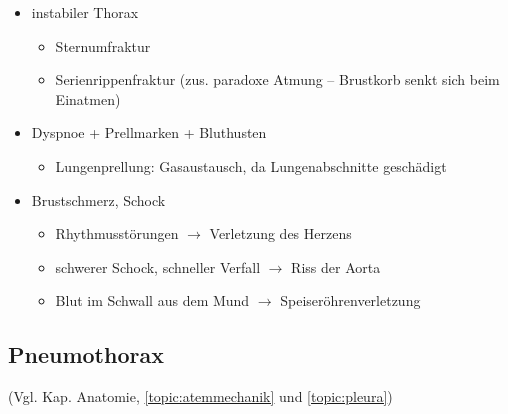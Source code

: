\begin{itemize}
    \item instabiler Thorax
    \begin{itemize}
        \item Sternumfraktur
        \item Serienrippenfraktur (zus. paradoxe Atmung --  Brustkorb senkt sich beim
        Einatmen)
    \end{itemize}
    \item Dyspnoe + Prellmarken +  Bluthusten
    \begin{itemize}
        \item Lungenprellung: Gasaustausch, da  Lungenabschnitte
        gesch\"adigt
    \end{itemize}
    \item Brustschmerz, Schock
    \begin{itemize}
        \item Rhythmusst\"orungen ${\rightarrow}$ Verletzung des  Herzens
        \item schwerer Schock, schneller Verfall ${\rightarrow}$ Riss der  Aorta
        \item Blut im Schwall aus dem Mund ${\rightarrow}$
        Speiser\"ohrenverletzung
    \end{itemize}
\end{itemize}

\subsection{Pneumothorax}\label{topic:pneumothorax}


(Vgl. Kap. Anatomie, \ref{topic:atemmechanik} und
\ref{topic:pleura})

